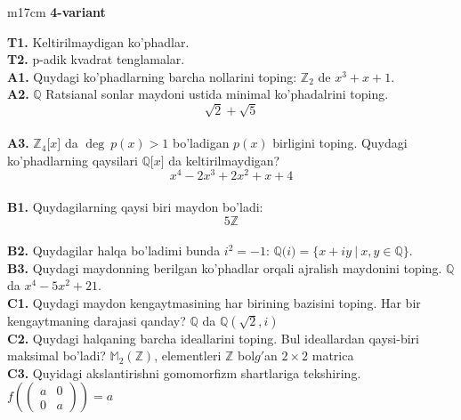 \documentclass{article}
\begin{document}
\begin{tabular}{m{17cm}}
\textbf{4-variant}
\newline

\textbf{T1.} Keltirilmaydigan ko'phadlar. \\
\textbf{T2.} p-adik kvadrat tenglamalar. \\
\textbf{A1.} Quydagi ko'phadlarning barcha nollarini toping:
\(\mathbb{Z}_{2}\) de \(x^{3} + x + 1\). \\
\textbf{A2.} \(\mathbb{Q}\) Ratsianal sonlar maydoni ustida minimal ko'phadalrini toping.
\[\sqrt{2} + \sqrt{5}\] \\
\textbf{A3.} \(\mathbb{Z}_{4}\lbrack x\rbrack\) da \(\deg\ p(x) > 1\) bo'ladigan \(p(x)\) birligini toping. Quydagi ko'phadlarning qaysilari \(\mathbb{Q\lbrack}x\rbrack\) da keltirilmaydigan?
\[x^{4} - 2x^{3} + 2x^{2} + x + 4\] \\
\textbf{B1.} Quydagilarning qaysi biri maydon bo'ladi:
\[5\mathbb{Z}\] \\
\textbf{B2.} Quydagilar halqa bo'ladimi bunda \(i^{2} = - 1\):
\(\mathbb{Q(}i) = \{ x + iy\ |\ x,y \in \mathbb{Q\}}\). \\
\textbf{B3.} Quydagi maydonning berilgan ko'phadlar orqali ajralish maydonini toping.
\(\mathbb{Q}\) da \(x^{4} - 5x^{2} + 21\). \\
\textbf{C1.} Quydagi maydon kengaytmasining har birining bazisini toping. Har bir kengaytmaning darajasi qanday?
\(\mathbb{Q}\) da \(\mathbb{Q}\left( \sqrt{2},i \right)\) \\
\textbf{C2.} Quydagi halqaning barcha ideallarini toping. Bul ideallardan qaysi-biri maksimal bo'ladi?
\(\mathbb{M}_{2}\left( \mathbb{Z} \right)\), elementleri \(\mathbb{Z}\) bol\(g'\)an \(2 \times 2\) matrica \\
\textbf{C3.} Quyidagi akslantirishni gomomorfizm shartlariga tekshiring. \(f\left( \begin{pmatrix}
a & 0 \\
0 & a
\end{pmatrix} \right) = a\) \\

\end{tabular}
\vspace{1cm}
\end{document}
